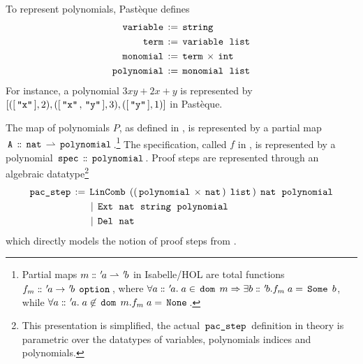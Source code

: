 To represent polynomials, Pastèque defines
\begin{align*}
	\iexp{variable}   & := \iexp{string}                    \\
	\iexp{term}       & := \iexp{variable} \app \iexp{list} \\
	\iexp{monomial}   & := \iexp{term} \times \iexp{int}    \\
	\iexp{polynomial} & := \iexp{monomial} \app \iexp{list}
\end{align*}
For instance, a polynomial $3xy + 2x + y$ is represented by
$[([\iexp{"x"}], 2), ([\iexp{"x"}, \iexp{"y"}], 3), ([\iexp{"y"}], 1)]$ in Pastèque.

The map of polynomials $P$, as defined in , is represented by a partial map $\iexp{A} \dbcolon \iexp{nat} \rightharpoonup \iexp{polynomial}$.\footnote{Partial maps $m \dbcolon \tv{a} \rightharpoonup \tv{b}$ in Isabelle/HOL are total functions $f_m \dbcolon \tv{a} \rightarrow \tv{b} \app \iexp{option}$, where $\forall a \dbcolon \tv{a}. \app a \in \iexp{dom} \app m \Rightarrow \exists b \dbcolon \tv{b}. f_m \app a = \iexp{Some} \app b$, while $\forall a \dbcolon \tv{a}. \app a \not\in \iexp{dom} \app m. f_m \app a = \iexp{None}$.}
The specification, called $f$ in , is represented by a polynomial $\iexp{spec} \dbcolon \iexp{polynomial}$.
Proof steps are represented through an algebraic datatype\footnote{
	This presentation is simplified, the actual $\iexp{pac\_step}$ definition in theory  is parametric over the datatypes of variables, polynomials indices and polynomials.
}
\begin{align*}
	\iexp{pac\_step} := \app & \iexp{LinComb} \app ((\iexp{polynomial} \times \iexp{nat}) \app \iexp{list}) \app \iexp{nat} \app \iexp{polynomial} \\
	                   & \mid \iexp{Ext} \app \iexp{nat} \app \iexp{string} \app \iexp{polynomial}                                           \\
	                   & \mid \iexp{Del} \app \iexp{nat}
\end{align*}
which directly models the notion of proof steps from .

